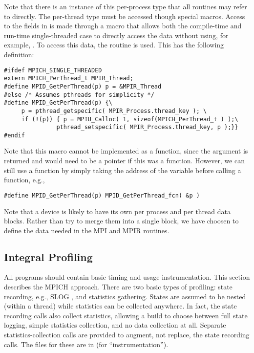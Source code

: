 \documentclass{article}
\begin{document}
Note that there is an instance of this per-process type that all routines may
refer to directly.  The per-thread type must be accessed though special
macros. 
Access to the fields in  is made through a macro that
allows both the compile-time and run-time single-threaded case to directly
access the data without using, for example, .
To access this data, the routine  is used.  This
has the following definition:
\begin{verbatim}
#ifdef MPICH_SINGLE_THREADED
extern MPICH_PerThread_t MPIR_Thread;
#define MPID_GetPerThread(p) p = &MPIR_Thread
#else /* Assumes pthreads for simplicity */
#define MPID_GetPerThread(p) {\
     p = pthread_getspecific( MPIR_Process.thread_key ); \
     if (!(p)) { p = MPIU_Calloc( 1, sizeof(MPICH_PerThread_t ) );\
               pthread_setspecific( MPIR_Process.thread_key, p );}}
#endif
\end{verbatim}

Note that this macro cannot be implemented as a function,
since the argument is returned and would need to be a pointer if this
was a function.  However, we can still use a function by simply
taking the address of the variable before calling a function, e.g., 
\begin{verbatim}
#define MPID_GetPerThread(p) MPID_GetPerThread_fcn( &p )
\end{verbatim}

Note that a device is likely to have its own per process and per
thread data blocks.  Rather than try to merge them into a single
block, we have choosen to define the data needed in the MPI and MPIR
routines.

\subsection{Integral Profiling}
\label{sec:builtin-timing}
All programs should contain basic timing and usage instrumentation.  This
section describes the MPICH approach.
There are two basic types of profiling: state recording, e.g., SLOG
\cite{slog}, and 
statistics gathering.  States are assumed to be nested (within a
thread) while statistics can be collected anywhere.  In fact, the
state recording calls also collect statistics, allowing a build to
choose between full state logging, simple statistics collection, and
no data collection at all.  Separate statistics-collection calls are
provided to augment, not replace, the state recording calls.
The files for these are in \file{util/instrm} (for ``instrumentation'').
\end{document}
